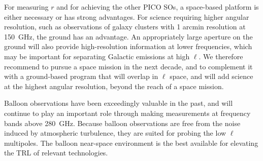 \documentclass[PICOReport.tex]{subfiles}
\begin{document}
For measuring $r$ and for achieving the other PICO SOs, a space-based platform is either necessary or has strong advantages.  For science requiring higher angular resolution, such as observations of galaxy clusters with 1 arcmin resolution at 150~GHz, the ground has an advantage. An appropriately large aperture on the ground will also provide high-resolution information at lower frequencies, which may be important for separating Galactic emissions at high $\ell$. We therefore recommend to pursue a space mission in the next decade, and to complement it with a ground-based program that will overlap in $\ell$ space, and will add science at the highest angular resolution, beyond the reach of a space mission.


Balloon observations have been exceedingly valuable in the past, and will continue to play an important role through making measurements at frequency bands above 280~GHz. Because balloon observations are free from the noise induced by atmospheric turbulence, they are suited for probing the low $\ell$ multipoles. The balloon near-space environment is the best available for elevating the TRL of relevant technologies. 


\end{document}
